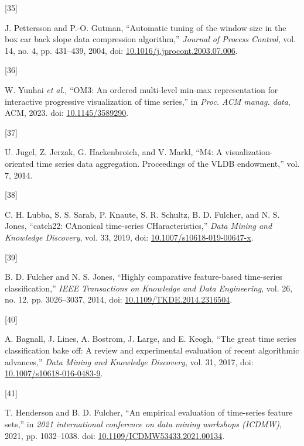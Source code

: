 \documentclass{article}
\newlength{\cslhangindent}
\newlength{\csllabelwidth}
\newlength{\cslentryspacingunit} %
\newenvironment{CSLReferences}[2] %
 {%
  \setlength{\parindent}{0pt}
  \ifodd #1
  \let\oldpar\par
  \def\par{\hangindent=\cslhangindent\oldpar}
  \fi
  \setlength{\parskip}{#2\cslentryspacingunit}
 }%
 {}
\newcommand{\CSLLeftMargin}[1]{\parbox[t]{\csllabelwidth}{#1}}
\newcommand{\CSLRightInline}[1]{\parbox[t]{\linewidth - \csllabelwidth}{#1}\break}
\begin{document}
\begin{CSLReferences}{0}{0}
\leavevmode{}%
\CSLLeftMargin{{[}35{]} }
\CSLRightInline{J. Pettersson and P.-O. Gutman, {``Automatic tuning of
the window size in the box car back slope data compression algorithm,''}
\emph{Journal of Process Control}, vol. 14, no. 4, pp. 431--439, 2004,
doi:
\href{https://doi.org/10.1016/j.jprocont.2003.07.006}{10.1016/j.jprocont.2003.07.006}.}

\leavevmode{}%
\CSLLeftMargin{{[}36{]} }
\CSLRightInline{W. Yunhai \emph{et al.}, {``OM3: An ordered multi-level
min-max representation for interactive progressive visualization of time
series,''} in \emph{Proc. ACM manag. data}, ACM, 2023. doi:
\href{https://doi.org/10.1145/3589290}{10.1145/3589290}.}

\leavevmode{}%
\CSLLeftMargin{{[}37{]} }
\CSLRightInline{U. Jugel, Z. Jerzak, G. Hackenbroich, and V. Markl,
{``M4: A visualization-oriented time series data aggregation.
Proceedings of the VLDB endowment,''} vol. 7, 2014.}

\leavevmode{}%
\CSLLeftMargin{{[}38{]} }
\CSLRightInline{C. H. Lubba, S. S. Sarab, P. Knaute, S. R. Schultz, B.
D. Fulcher, and N. S. Jones, {``catch22: CAnonical time-series
CHaracteristics,''} \emph{Data Mining and Knowledge Discovery}, vol. 33,
2019, doi:
\href{https://doi.org/10.1007/s10618-019-00647-x}{10.1007/s10618-019-00647-x}.}

\leavevmode{}%
\CSLLeftMargin{{[}39{]} }
\CSLRightInline{B. D. Fulcher and N. S. Jones, {``Highly comparative
feature-based time-series classification,''} \emph{IEEE Transactions on
Knowledge and Data Engineering}, vol. 26, no. 12, pp. 3026--3037, 2014,
doi:
\href{https://doi.org/10.1109/TKDE.2014.2316504}{10.1109/TKDE.2014.2316504}.}

\leavevmode{}%
\CSLLeftMargin{{[}40{]} }
\CSLRightInline{A. Bagnall, J. Lines, A. Bostrom, J. Large, and E.
Keogh, {``The great time series classification bake off: A review and
experimental evaluation of recent algorithmic advances,''} \emph{Data
Mining and Knowledge Discovery}, vol. 31, 2017, doi:
\href{https://doi.org/10.1007/s10618-016-0483-9}{10.1007/s10618-016-0483-9}.}

\leavevmode{}%
\CSLLeftMargin{{[}41{]} }
\CSLRightInline{T. Henderson and B. D. Fulcher, {``An empirical
evaluation of time-series feature sets,''} in \emph{2021 international
conference on data mining workshops (ICDMW)}, 2021, pp. 1032--1038. doi:
\href{https://doi.org/10.1109/ICDMW53433.2021.00134}{10.1109/ICDMW53433.2021.00134}.}


\end{CSLReferences}
\end{document}
